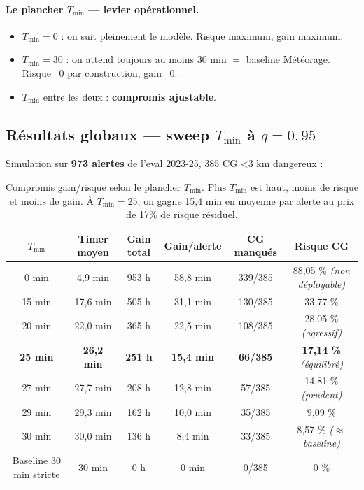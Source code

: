 \documentclass[11pt,a4paper]{article}
\begin{document}
\paragraph{Le plancher $T_{\min}$ — levier opérationnel.}
\begin{itemize}[topsep=2pt]
    \item $T_{\min} = 0$ : on suit pleinement le modèle. Risque maximum, gain maximum.
    \item $T_{\min} = 30$ : on attend toujours au moins 30 min $=$ baseline Météorage.
    Risque ~0 par construction, gain ~0.
    \item $T_{\min}$ entre les deux : \textbf{compromis ajustable}.
\end{itemize}

\subsection{Résultats globaux — sweep $T_{\min}$ à $q = 0{,}95$}

Simulation sur \textbf{973 alertes} de l'eval 2023-25, 385 CG <3 km dangereux :

\begin{table}[H]
\centering
\small
\begin{tabular}{cccccc}
\toprule
\textbf{$T_{\min}$} & \textbf{Timer moyen} & \textbf{Gain total} & \textbf{Gain/alerte} & \textbf{CG manqués} & \textbf{Risque CG} \\
\midrule
 0 min &  4,9 min & 953 h & 58,8 min & 339/385 & 88,05 \% \textit{(non déployable)} \\
15 min & 17,6 min & 505 h & 31,1 min & 130/385 & 33,77 \% \\
20 min & 22,0 min & 365 h & 22,5 min & 108/385 & 28,05 \% \textit{(agressif)} \\
\textbf{25 min} & \textbf{26,2 min} & \textbf{251 h} & \textbf{15,4 min} & \textbf{66/385} & \textbf{17,14 \%} \textit{(équilibré)} \\
27 min & 27,7 min & 208 h & 12,8 min & 57/385 & 14,81 \% \textit{(prudent)} \\
29 min & 29,3 min & 162 h & 10,0 min & 35/385 &  9,09 \% \\
30 min & 30,0 min & 136 h &  8,4 min & 33/385 &  8,57 \% \textit{($\approx$ baseline)} \\
\midrule
Baseline 30 min stricte & 30 min & 0 h & 0 min & 0/385 & 0 \% \\
\bottomrule
\end{tabular}
\caption{Compromis gain/risque selon le plancher $T_{\min}$. Plus $T_{\min}$ est haut, moins
de risque et moins de gain. À $T_{\min}=25$, on gagne 15,4 min en moyenne par alerte au prix
de 17\% de risque résiduel.}
\label{tab:sweep_tmin}
\end{table}
\end{document}
